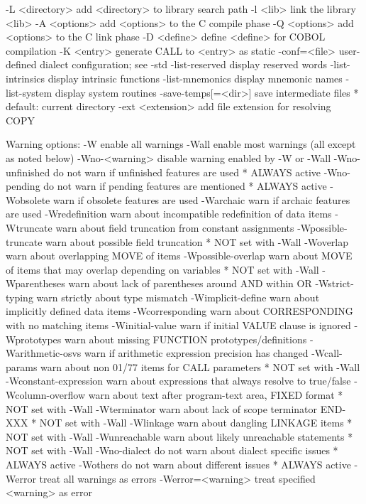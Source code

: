   -L <directory>        add <directory> to library search path
  -l <lib>              link the library <lib>
  -A <options>          add <options> to the C compile phase
  -Q <options>          add <options> to the C link phase
  -D <define>           define <define> for COBOL compilation
  -K <entry>            generate CALL to <entry> as static
  -conf=<file>          user-defined dialect configuration; see -std
  -list-reserved        display reserved words
  -list-intrinsics      display intrinsic functions
  -list-mnemonics       display mnemonic names
  -list-system          display system routines
  -save-temps[=<dir>]   save intermediate files
                        * default: current directory
  -ext <extension>      add file extension for resolving COPY

Warning options:
  -W                    enable all warnings
  -Wall                 enable most warnings (all except as noted below)
  -Wno-<warning>        disable warning enabled by -W or -Wall
  -Wno-unfinished       do not warn if unfinished features are used
                        * ALWAYS active
  -Wno-pending          do not warn if pending features are mentioned
                        * ALWAYS active
  -Wobsolete            warn if obsolete features are used
  -Warchaic             warn if archaic features are used
  -Wredefinition        warn about incompatible redefinition of data items
  -Wtruncate            warn about field truncation from constant assignments
  -Wpossible-truncate   warn about possible field truncation
                        * NOT set with -Wall
  -Woverlap             warn about overlapping MOVE of items
  -Wpossible-overlap    warn about MOVE of items that may overlap depending on variables
                        * NOT set with -Wall
  -Wparentheses         warn about lack of parentheses around AND within OR
  -Wstrict-typing       warn strictly about type mismatch
  -Wimplicit-define     warn about implicitly defined data items
  -Wcorresponding       warn about CORRESPONDING with no matching items
  -Winitial-value       warn if initial VALUE clause is ignored
  -Wprototypes          warn about missing FUNCTION prototypes/definitions
  -Warithmetic-osvs     warn if arithmetic expression precision has changed
  -Wcall-params         warn about non 01/77 items for CALL parameters
                        * NOT set with -Wall
  -Wconstant-expression  warn about expressions that always resolve to true/false
  -Wcolumn-overflow     warn about text after program-text area, FIXED format
                        * NOT set with -Wall
  -Wterminator          warn about lack of scope terminator END-XXX
                        * NOT set with -Wall
  -Wlinkage             warn about dangling LINKAGE items
                        * NOT set with -Wall
  -Wunreachable         warn about likely unreachable statements
                        * NOT set with -Wall
  -Wno-dialect          do not warn about dialect specific issues
                        * ALWAYS active
  -Wothers              do not warn about different issues
                        * ALWAYS active
  -Werror               treat all warnings as errors
  -Werror=<warning>     treat specified <warning> as error

